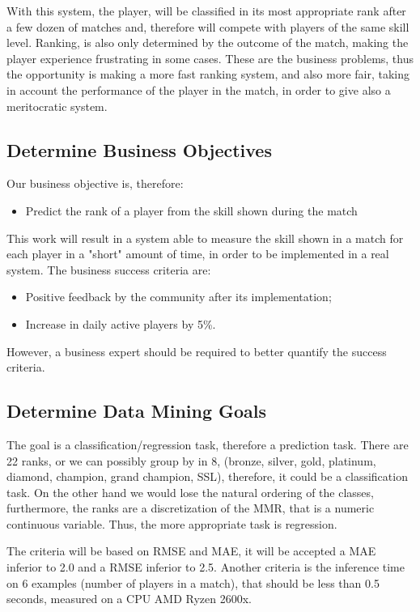 With this system, the player, will be classified in its most appropriate rank after a few dozen of matches and, therefore will compete with players of the same skill level.
Ranking, is also only determined by the outcome of the match, making the player experience frustrating in some cases. These are the business problems, thus the opportunity is making a more fast ranking system, and also more fair, taking in account the performance of the player in the match, in order to give also a meritocratic system.

\subsection{Determine Business Objectives}

Our business objective is, therefore:
\begin{itemize}
    \item Predict the rank of a player from the skill shown during the match
\end{itemize}


This work will result in a system able to measure the skill shown in a match for each player in a "short" amount of time, in order to be implemented in a real system.
The business success criteria are:
\begin{itemize}
    \item Positive feedback by the community after its implementation;
    \item Increase in daily active players by 5\%.
\end{itemize}

However, a business expert should be required to better quantify the success criteria.

\subsection{Determine Data Mining Goals}
\label{sec:min_goal}
The goal is a classification/regression task, therefore a prediction task. There are 22 ranks, or we can possibly group by in 8, (bronze, silver, gold, platinum, diamond, champion, grand champion, SSL), therefore, it could be a classification task. On the other hand we would lose the natural ordering of the classes, furthermore, the ranks are a discretization of the MMR, that is a numeric continuous variable. Thus, the more appropriate task is regression.

The criteria will be based on RMSE and MAE, it will be accepted a MAE inferior to 2.0 and a RMSE inferior to 2.5. 
Another criteria is the inference time on 6 examples (number of players in a match), that should be less than 0.5 seconds, measured on a CPU AMD Ryzen 2600x.
